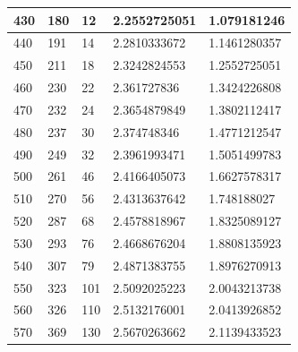 \documentclass[12pt letterpaper]{article}
\begin{document}
\begin{table}[!htb]
\begin{tabular}{|l|p{1.25cm}|p{1.25cm}|l|l|}
430        & 180                           & 12                             & 2.2552725051          & 1.079181246            \\ \hline
440        & 191                           & 14                             & 2.2810333672          & 1.1461280357           \\ \hline
450        & 211                           & 18                             & 2.3242824553          & 1.2552725051           \\ \hline
460        & 230                           & 22                             & 2.361727836           & 1.3424226808           \\ \hline
470        & 232                           & 24                             & 2.3654879849          & 1.3802112417           \\ \hline
480        & 237                           & 30                             & 2.374748346           & 1.4771212547           \\ \hline
490        & 249                           & 32                             & 2.3961993471          & 1.5051499783           \\ \hline
500        & 261                           & 46                             & 2.4166405073          & 1.6627578317           \\ \hline
510        & 270                           & 56                             & 2.4313637642          & 1.748188027            \\ \hline
520        & 287                           & 68                             & 2.4578818967          & 1.8325089127           \\ \hline
530        & 293                           & 76                             & 2.4668676204          & 1.8808135923           \\ \hline
540        & 307                           & 79                             & 2.4871383755          & 1.8976270913           \\ \hline
550        & 323                           & 101                            & 2.5092025223          & 2.0043213738           \\ \hline
560        & 326                           & 110                            & 2.5132176001          & 2.0413926852           \\ \hline
570        & 369                           & 130                            & 2.5670263662          & 2.1139433523           \\ \hline

\end{tabular}
\end{table}
\end{document}
